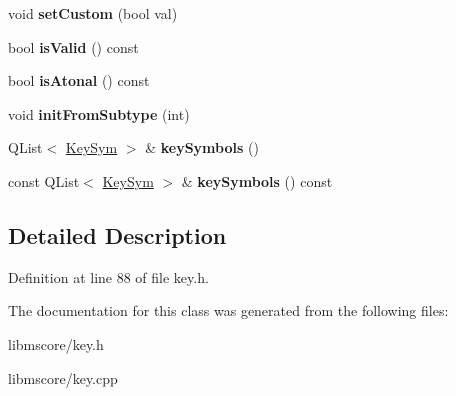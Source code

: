 \begin{DoxyCompactItemize}
\mbox{\label{class_ms_1_1_key_sig_event_a9f2d6b1380f2c14635313cd33d844856}} 
void {\bfseries set\+Custom} (bool val)
\item 
\mbox{\label{class_ms_1_1_key_sig_event_a9bee1876bbec907fb6a425d4878ea71b}} 
bool {\bfseries is\+Valid} () const
\item 
\mbox{\label{class_ms_1_1_key_sig_event_af600bd46ab275bd4d2b82da956654037}} 
bool {\bfseries is\+Atonal} () const
\item 
\mbox{\label{class_ms_1_1_key_sig_event_a4d25aef2d5ff6f512efe0c1d90e335ee}} 
void {\bfseries init\+From\+Subtype} (int)
\item 
\mbox{\label{class_ms_1_1_key_sig_event_a15ff5090a86fdc8ce70d00e293ca073b}} 
Q\+List$<$ \hyperlink{struct_ms_1_1_key_sym}{Key\+Sym} $>$ \& {\bfseries key\+Symbols} ()
\item 
\mbox{\label{class_ms_1_1_key_sig_event_abc35d3442b3e3e8b78b17a3ec661afd7}} 
const Q\+List$<$ \hyperlink{struct_ms_1_1_key_sym}{Key\+Sym} $>$ \& {\bfseries key\+Symbols} () const
\end{DoxyCompactItemize}


\subsection{Detailed Description}


Definition at line 88 of file key.\+h.



The documentation for this class was generated from the following files\+:\begin{DoxyCompactItemize}
\item 
libmscore/key.\+h\item 
libmscore/key.\+cpp\end{DoxyCompactItemize}

